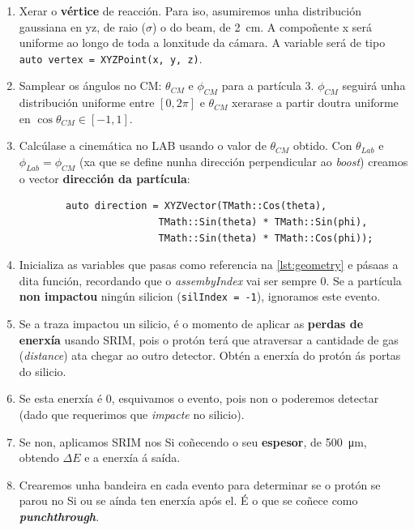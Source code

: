 \documentclass[11pt, a4paper]{article}
\begin{document}
\begin{enumerate}
    \item Xerar o \textbf{vértice} de reacción. Para iso, asumiremos unha distribución gaussiana en yz, de raio ($\sigma$) o do beam, de \qty{2}{\cm}. A compoñente x será uniforme ao longo de toda a lonxitude da cámara. A variable será de tipo \lstinline{auto vertex = XYZPoint(x, y, z)}.
    \item Samplear os ángulos no CM: $\theta_{CM}$ e $\phi_{CM}$ para a partícula 3. $\phi_{CM}$ seguirá unha distribución uniforme entre $[0, 2\pi]$ e $\theta_{CM}$ xerarase a partir doutra uniforme en $\cos{\theta_{CM}} \in [-1,1]$.
    \item Calcúlase a cinemática no LAB usando o valor de $\theta_{CM}$ obtido. Con $\theta_{Lab}$ e $\phi_{Lab} = \phi_{CM}$ (xa que se define nunha dirección perpendicular ao \textit{boost}) creamos o vector \textbf{dirección da partícula}:
          \begin{lstlisting}
        auto direction = XYZVector(TMath::Cos(theta), 
                        TMath::Sin(theta) * TMath::Sin(phi), 
                        TMath::Sin(theta) * TMath::Cos(phi));
    \end{lstlisting}
    \item Inicializa as variables que pasas como referencia na \autoref{lst:geometry} e pásaas a dita función, recordando que o \textit{assembyIndex} vai ser sempre 0. Se a partícula \textbf{non impactou} ningún silicion (\lstinline{silIndex = -1}), ignoramos este evento.
    \item Se a traza impactou un silicio, é o momento de aplicar as \textbf{perdas de enerxía} usando SRIM, pois o protón terá que atraversar a cantidade de gas (\textit{distance}) ata chegar ao outro detector. Obtén a enerxía do protón ás portas do silicio.
    \item Se esta enerxía é 0, esquivamos o evento, pois non o poderemos detectar (dado que requerimos que \textit{impacte} no silicio).
    \item Se non, aplicamos SRIM nos Si coñecendo o seu \textbf{espesor}, de \qty{500}{\micro\m}, obtendo $\Delta E$ e a enerxía á saída.
    \item Crearemos unha bandeira en cada evento para determinar se o protón se parou no Si ou se aínda ten enerxía após el. É o que se coñece como \textit{\textbf{punchthrough}}.
\end{enumerate}
\end{document}
